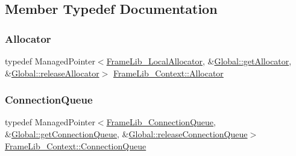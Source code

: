 \subsection{Member Typedef Documentation}
\mbox{\label{class_frame_lib___context_a4cfa321c8f6048211d031f05156b5b19}} 
\subsubsection{\texorpdfstring{Allocator}{Allocator}}
{\footnotesize\ttfamily typedef Managed\+Pointer$<$\hyperlink{class_frame_lib___local_allocator}{Frame\+Lib\+\_\+\+Local\+Allocator}, \&\hyperlink{class_frame_lib___global_a31c3fae37e27c9cce286d30ed30838d3}{Global\+::get\+Allocator}, \&\hyperlink{class_frame_lib___global_a78b0ff45eb662f12c41bdd641a416539}{Global\+::release\+Allocator}$>$ \hyperlink{class_frame_lib___context_a4cfa321c8f6048211d031f05156b5b19}{Frame\+Lib\+\_\+\+Context\+::\+Allocator}}

\mbox{\label{class_frame_lib___context_ab71b26193867cfa080362bd19a87596b}} 
\subsubsection{\texorpdfstring{Connection\+Queue}{ConnectionQueue}}
{\footnotesize\ttfamily typedef Managed\+Pointer$<$\hyperlink{class_frame_lib___connection_queue}{Frame\+Lib\+\_\+\+Connection\+Queue}, \&\hyperlink{class_frame_lib___global_ae0cfe1ff49ba163758fcb66f9e94b991}{Global\+::get\+Connection\+Queue}, \&\hyperlink{class_frame_lib___global_ab461ad3b4bdd9c580018373cf1617b1b}{Global\+::release\+Connection\+Queue}$>$ \hyperlink{class_frame_lib___context_ab71b26193867cfa080362bd19a87596b}{Frame\+Lib\+\_\+\+Context\+::\+Connection\+Queue}}

\mbox{\label{class_frame_lib___context_a1a18438b08e39c370de0e5794029ba77}} 

